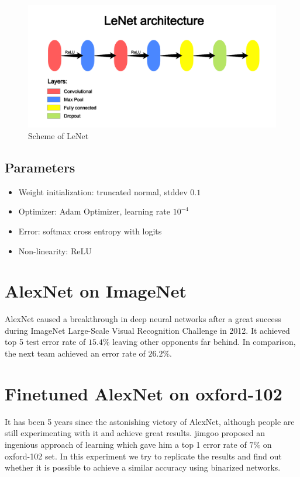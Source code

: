 \documentclass[licencjacka]{pracamgr}
\begin{document}
 			\begin{figure}[h]
				\caption{Scheme of LeNet}
				\label{fig:42}
				\centering
				\includegraphics[width=\textwidth]{LeNet}
			\end{figure}
 		\subsection{Parameters}
 			\begin{itemize}
 			\item Weight initialization: truncated normal, stddev $0.1$
 			\item Optimizer: Adam Optimizer, learning rate $10^{-4}$
 			\item Error: softmax cross entropy with logits
 			\item Non-linearity: ReLU
 			\end{itemize}
 	\section{AlexNet on ImageNet}
 	AlexNet caused a breakthrough in deep neural networks after a great success during ImageNet Large-Scale Visual Recognition Challenge in 2012. It achieved top 5 test error rate of $15.4\%$ leaving other opponents far behind. In comparison, the next team achieved an error rate of $26.2\%$. 
 	\section{Finetuned AlexNet on oxford-102}
 	It has been 5 years since the astonishing victory of AlexNet, although people are still experimenting with it and achieve great results. jimgoo \cite{jimgoo} proposed an ingenious approach of learning which gave him a top 1 error rate of $7\%$ on oxford-102 set. In this experiment we try to replicate the results and find out whether it is possible to achieve a similar accuracy using binarized networks. 
\end{document}
